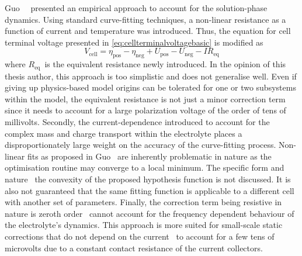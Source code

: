 Guo~\etal~\cite{Guo2011a}  presented an  empirical approach  to account  for the
solution-phase dynamics.  Using standard curve-fitting techniques,  a non-linear
resistance as  a function of current  and temperature was introduced.  Thus, the
equation for cell terminal voltage presented
in \cref{eq:cellterminalvoltagebasic} is modified as
\begin{equation}
    V_\text{cell} = η_\text{pos} - η_\text{neg} + U_\text{pos} - U_\text{neg} - I R_\text{eq}
\end{equation}
where  $R_\text{eq}$~is  the  equivalent  resistance newly  introduced.  In  the
opinion of  this thesis  author, this  approach is too  simplistic and  does not
generalise well. Even if giving up  physics-based model origins can be tolerated
for one  or two subsystems  within the model,  the equivalent resistance  is not
just a minor correction term since it  needs to account for a large polarization
voltage of  the order  of tens of  millivolts. Secondly,  the current-dependence
introduced  to account  for the  complex mass  and charge  transport within  the
electrolyte  places a  disproportionately large  weight on  the accuracy  of the
curve-fitting process. Non-linear fits as proposed in Guo~\etal{} are inherently
problematic  in nature  as  the optimisation  routine may  converge  to a  local
minimum.  The  specific  form  and  nature \eg~the  convexity  of  the  proposed
hypothesis  function is  not  discussed.  It is  also  not  guaranteed that  the
same  fitting function  is  applicable  to a  different  cell  with another  set
of  parameters.  Finally, the  correction  term  being  resistive in  nature  is
zeroth order  \ie~cannot account  for the frequency  dependent behaviour  of the
electrolyte's  dynamics. This  approach is  more suited  for small-scale  static
corrections that do not  depend on the current \eg~to account for  a few tens of
microvolts due to a constant contact resistance of the current collectors.


